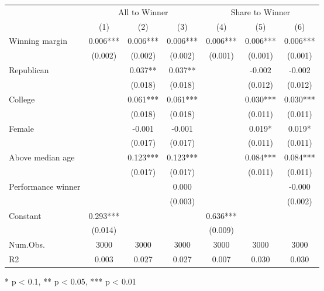 \begin{table}[t]
\fontsize{12.0pt}{14.4pt}\selectfont
\begin{tabular*}{\linewidth}{@{\extracolsep{\fill}}lcccccc}
\toprule
 & \multicolumn{3}{c}{All to Winner} & \multicolumn{3}{c}{Share to Winner} \\ 
\cmidrule(lr){2-4} \cmidrule(lr){5-7}
  & (1) & (2) & (3) & (4) & (5) & (6) \\ 
\midrule\addlinespace[2.5pt]
Winning margin & 0.006*** & 0.006*** & 0.006*** & 0.006*** & 0.006*** & 0.006*** \\ 
 & (0.002) & (0.002) & (0.002) & (0.001) & (0.001) & (0.001) \\ 
Republican &  & 0.037** & 0.037** &  & -0.002 & -0.002 \\ 
 &  & (0.018) & (0.018) &  & (0.012) & (0.012) \\ 
College &  & 0.061*** & 0.061*** &  & 0.030*** & 0.030*** \\ 
 &  & (0.018) & (0.018) &  & (0.011) & (0.011) \\ 
Female &  & -0.001 & -0.001 &  & 0.019* & 0.019* \\ 
 &  & (0.017) & (0.017) &  & (0.011) & (0.011) \\ 
Above median age &  & 0.123*** & 0.123*** &  & 0.084*** & 0.084*** \\ 
 &  & (0.017) & (0.017) &  & (0.011) & (0.011) \\ 
Performance winner &  &  & 0.000 &  &  & -0.000 \\ 
 &  &  & (0.003) &  &  & (0.002) \\ 
Constant & 0.293*** &  &  & 0.636*** &  &  \\ 
{} & {(0.014)} & {} & {} & {(0.009)} & {} & {} \\ 
Num.Obs. & 3000 & 3000 & 3000 & 3000 & 3000 & 3000 \\ 
R2 & 0.003 & 0.027 & 0.027 & 0.007 & 0.030 & 0.030 \\ 
\bottomrule
\end{tabular*}
\begin{minipage}{\linewidth}
* p < 0.1, ** p < 0.05, *** p < 0.01\\
\end{minipage}
\end{table}

